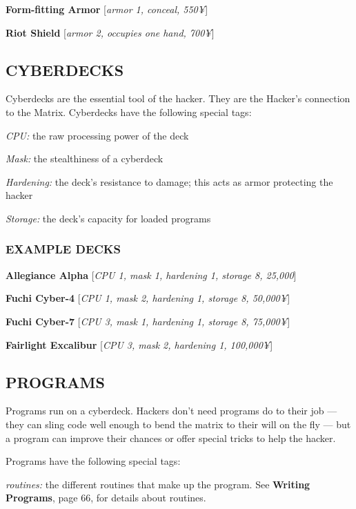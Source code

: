 \documentclass[oneside,10pt]{article}
\begin{document}
\begin{multicols}{2}
  \textbf{Form-fitting Armor} [\textit{armor 1, conceal, 550¥}]

  \textbf{Riot Shield} [\textit{armor 2, occupies one hand, 700¥}]


  \subsection{CYBERDECKS}
  Cyberdecks are the essential tool of the hacker. They are the
  Hacker’s connection to the Matrix. Cyberdecks have the following
  special tags:

  \begin{dent}
    \textit{CPU:} the raw processing power of the deck

    \textit{Mask:} the stealthiness of a cyberdeck

    \textit{Hardening:} the deck’s resistance to damage; this acts as
    armor protecting the hacker

    \textit{Storage:} the deck’s capacity for loaded programs
  \end{dent}

  \subsubsection{EXAMPLE DECKS}
  \textbf{Allegiance Alpha} [\textit{CPU 1, mask 1, hardening 1,
    storage 8, 25,000}]

  \textbf{Fuchi Cyber-4} [\textit{CPU 1, mask 2, hardening 1, storage
    8, 50,000¥}]

  \textbf{Fuchi Cyber-7} [\textit{CPU 3, mask 1, hardening 1, storage
    8, 75,000¥}]

  \textbf{Fairlight Excalibur} [\textit{CPU 3, mask 2, hardening 1,
    100,000¥}]


  \subsection{PROGRAMS}
  Programs run on a cyberdeck. Hackers don’t need programs do to their
  job — they can sling code well enough to bend the matrix to their will
  on the fly — but a program can improve their chances or offer special
  tricks to help the hacker.

  Programs have the following special tags:
  \begin{dent}

    \textit{routines:} the different routines that make up the
    program.  See \textbf{Writing Programs}, page 66, for details
    about routines.


\end{dent}
\end{multicols}
\end{document}
